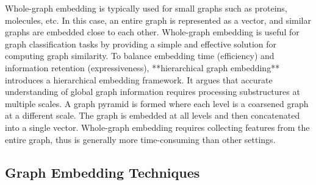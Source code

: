 Whole-graph embedding is typically used for small graphs such as proteins, molecules, etc. In this case, an entire graph is represented as a vector, and similar graphs are embedded close to each other. Whole-graph embedding is useful for graph classification tasks by providing a simple and effective solution for computing graph similarity. To balance embedding time (efficiency) and information retention (expressiveness), **hierarchical graph embedding** \cite{mousavi2017hierarchical} introduces a hierarchical embedding framework. It argues that accurate understanding of global graph information requires processing substructures at multiple scales. A graph pyramid is formed where each level is a coarsened graph at a different scale. The graph is embedded at all levels and then concatenated into a single vector. Whole-graph embedding requires collecting features from the entire graph, thus is generally more time-consuming than other settings.


\subsection{Graph Embedding Techniques}

